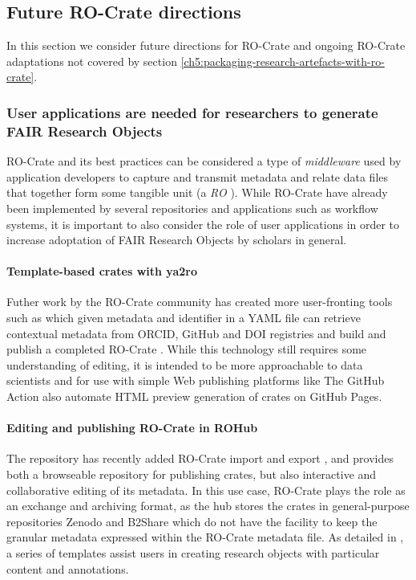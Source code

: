 \subsection{Future RO-Crate directions}
\label{ch61:rocratefuture}
In this section we consider future directions for RO-Crate and ongoing RO-Crate adaptations not covered by section \ref{ch5:packaging-research-artefacts-with-ro-crate}.


\subsubsection{User applications are needed for researchers to generate FAIR Research Objects}
\label{ch61:applications}

RO-Crate and its best practices can be considered a type of \emph{middleware} used by application developers to capture and transmit metadata and relate data files that together form some tangible unit (a \emph{
\acrfull{RO}
} \cite{Bechhofer 2013}). While RO-Crate have already been implemented by several repositories and applications such as workflow systems, it is important to also consider the role of user applications in order to increase adoptation of FAIR Research Objects by scholars in general.

\paragraph{Template-based crates with ya2ro}
Futher work by the RO-Crate community has created more user-fronting tools such as  which given metadata and identifier in a \acrshort{YAML}
file can retrieve contextual metadata from ORCID, GitHub and \acrshort{DOI} registries and build and publish a completed RO-Crate \cite{Pavel 2023}.   
While this technology still requires some understanding of editing, it is intended to be more approachable to data scientists and for use with simple Web publishing platforms like  The GitHub Action  also automate \acrshort{HTML} preview generation of crates on GitHub Pages.

\paragraph{Editing and publishing RO-Crate in ROHub}
The repository  \cite{Garcia-Silva 2019} has recently added RO-Crate import and export \cite{Fouilloux 2023}, and provides both a browseable repository for publishing crates, but also interactive and collaborative editing of its metadata. 
In this use case, RO-Crate plays the role as an exchange and archiving format, as the hub stores the crates in general-purpose repositories Zenodo and B2Share which do not have the facility to keep the granular metadata expressed within the RO-Crate metadata file. As detailed in \cite{Fouilloux 2023}, a series of templates assist users in creating research objects with particular content and annotations. 

